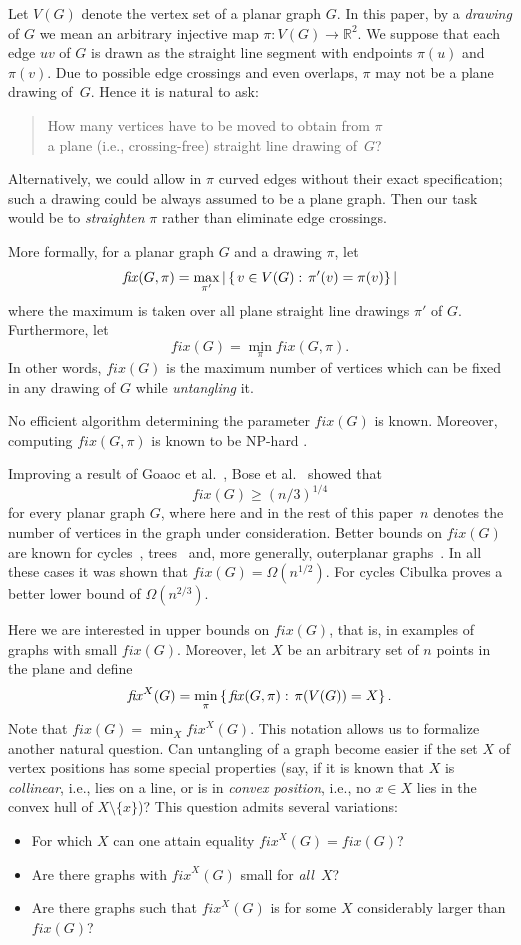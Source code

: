 \documentclass[reqno,12pt]{amsart}
\newcommand{\fix}[1]{\mathit{fix}(#1)}
\newcommand{\reals}{\mathbb{R}}
\newcommand{\function}[2]{:#1 \rightarrow #2}
\newcommand{\setdef}[2]{\left\{ \hspace{0.5mm} #1 : \hspace{0.5mm} #2 \right\}}
\newcommand{\fixx}[1]{\mathit{fix}^X(#1)}
\begin{document}
Let $V(G)$ denote the vertex set of a planar graph $G$. In this paper,
by a \emph{drawing} of $G$ we mean an arbitrary injective map
$\pi\function{V(G)}{\reals^2}$. We suppose that each edge $uv$
of $G$ is drawn as the straight line segment with endpoints $\pi(u)$
and $\pi(v)$.
Due to possible edge crossings and even overlaps,
$\pi$ may not be a plane drawing of~$G$. Hence it is natural to ask:
\begin{quote}
How many vertices have to be moved to obtain from $\pi$\\
a plane (i.e., crossing-free) straight line drawing of~$G$?
\end{quote}
Alternatively, we could 
allow in $\pi$ curved edges without their exact specification; such a drawing 
could be always assumed to be a plane graph. Then our task would be
to \emph{straighten} $\pi$ rather than eliminate edge crossings.

More formally, for a planar graph $G$ and a drawing $\pi$, let
$$
\fix{G,\pi}=\max_{\pi'}|\setdef{v\in V(G)}{\pi'(v)=\pi(v)}|
$$
where the maximum is taken over all plane straight line drawings $\pi'$ of $G$.
Furthermore, let
\begin{equation}\label{eq:deffix}
\fix G=\min_\pi\fix{G,\pi}.
\end{equation}
In other words, $\fix G$ is the maximum number of vertices
which can be fixed in any drawing of $G$ while \emph{untangling} it.

No efficient algorithm determining the parameter $\fix G$ is known.
Moreover, computing $\fix{G,\pi}$ is known to be NP-hard \cite{merged,Ver}.

Improving a result of Goaoc et al.~\cite{merged},
Bose et al.~\cite{Bose} showed that
$$
\fix G\ge(n/3)^{1/4}
$$
for every planar graph $G$, where here and in the rest of this paper~$n$ 
denotes the number of vertices
in the graph under consideration. Better bounds on $\fix G$ are known
for cycles~\cite{PTa}, trees~\cite{merged,Bose} and, more generally, outerplanar 
graphs~\cite{merged,RVe}. In all these cases it was shown that $\fix G=\Omega(n^{1/2})$.
For cycles Cibulka \cite{Cib} proves a better lower bound of $\Omega(n^{2/3})$.

Here we are interested in upper bounds on $\fix G$, that is, in examples of graphs
with small $\fix G$. Moreover, let $X$ be an arbitrary set of $n$ points in the 
plane and define
$$
\fixx G=\min_\pi\setdef{\fix{G,\pi}}{\pi(V(G))=X}.
$$
Note that $\fix G=\min_X\fixx G$.
This notation allows us to formalize another natural question.
Can untangling of a graph become easier if the set $X$ of vertex positions
has some special properties (say, if it is known that $X$ is \emph{collinear}, i.e.,
lies on a line, or is in \emph{convex position}, i.e., 
no $x\in X$ lies in the convex hull of $X\setminus\{x\}$)? 
This question admits several variations:
\begin{itemize}
\item
For which $X$ can one attain equality $\fixx G=\fix G$?
\item
Are there graphs with $\fixx G$ small for \emph{all}~$X$?
\item
Are there graphs such that $\fixx G$ is for some $X$ considerably
larger than $\fix G$?
\end{itemize}
\end{document}
